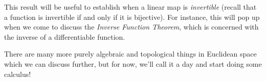  This result will be useful to establish when a linear map is \emph{invertible} (recall that a function is invertible if and only if it is bijective). For instance, this will pop up when we come to discuss the \emph{Inverse Function Theorem}, which is concerned with the inverse of a differentiable function.

 \vspace{3mm}

 There are many more purely algebraic and topological things in Euclidean space which we can discuss further, but for now, we'll call it a day and start doing some calculus!

